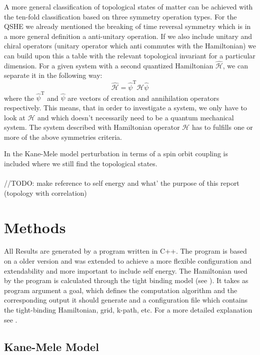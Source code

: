 \documentclass[a4paper,11pt]{report}
\begin{document}
A more general classification of topological states of matter can be achieved with the ten-fold classification based on three symmetry operation types. For
the QSHE we already mentioned the breaking of time reversal symmetry which is in a more general definition a anti-unitary operation. If we also include
unitary and chiral operators (unitary operator which anti commutes with the Hamiltonian) we can build upon this a table with the relevant topological invariant for a particular dimension. For a given system with
a second quantized Hamiltonian $\hat{\mathcal{H}}$, we can separate it in the following way:
\begin{equation}\label{eq:7}
 \hat{\mathcal{H}} = \hat{\psi}^{\mathrm{T}}\mathcal{H}\hat{\psi}
\end{equation}
where the $\hat{\psi}^{\mathrm{T}}$ and $\hat{\psi}$ are vectors of creation and annihilation operators respectively. This means, that in order to
investigate a system, we only have to look at $\mathcal{H}$ and which doesn't necessarily need to be a quantum mechanical system.
The system described with Hamiltonian operator $\mathcal{H}$ has to fulfills one or more of the above symmetries criteria.

In the Kane-Mele model perturbation in terms of a spin orbit coupling is included where we still find the topological states.\\
\\
//TODO: make reference to self energy and what' the purpose of this report (topology with correlation)


\chapter{Methods}\label{s:methods}

All Results are generated by a program written in C++. The program is based on a older version and was extended to achieve a more flexible
configuration and extendability and more important to include self energy. The Hamiltonian used by the program is calculated through the tight binding model (see ).
It takes as program argument a goal, which defines the computation algorithm and the corresponding output it should
generate and a configuration file which contains the tight-binding Hamiltonian, grid, k-path, etc. For a more detailed explanation see .

\section{Kane-Mele Model}\label{s:kane-mele}
\end{document}
